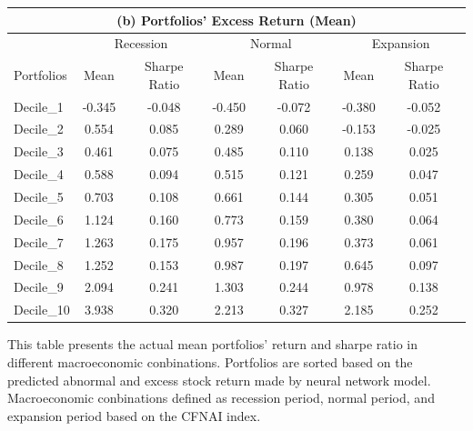 \begin{table}[H]
\begin{tabular}{l|cc|cc|cc}
      \multicolumn{7}{c}{(b) Portfolios' Excess Return (Mean)}\\\hline
      ~ & \multicolumn{2}{c}{Recession} & \multicolumn{2}{c}{Normal} & \multicolumn{2}{c}{Expansion} \\ \cline{2-7}
      Portfolios & Mean & Sharpe Ratio & Mean & Sharpe Ratio & Mean & Sharpe Ratio \\ \hline
      Decile\_1 & -0.345 & -0.048 & -0.450 & -0.072 & -0.380 & -0.052 \\ 
      Decile\_2 & 0.554 & 0.085 & 0.289 & 0.060 & -0.153 & -0.025 \\ 
      Decile\_3 & 0.461 & 0.075 & 0.485 & 0.110 & 0.138 & 0.025 \\ 
      Decile\_4 & 0.588 & 0.094 & 0.515 & 0.121 & 0.259 & 0.047 \\ 
      Decile\_5 & 0.703 & 0.108 & 0.661 & 0.144 & 0.305 & 0.051 \\ 
      Decile\_6 & 1.124 & 0.160 & 0.773 & 0.159 & 0.380 & 0.064 \\ 
      Decile\_7 & 1.263 & 0.175 & 0.957 & 0.196 & 0.373 & 0.061 \\ 
      Decile\_8 & 1.252 & 0.153 & 0.987 & 0.197 & 0.645 & 0.097 \\ 
      Decile\_9 & 2.094 & 0.241 & 1.303 & 0.244 & 0.978 & 0.138 \\ 
      Decile\_10 & 3.938 & 0.320 & 2.213 & 0.327 & 2.185 & 0.252 \\ \hline
  \end{tabular}
  \label{table: portfolio ret in tertiles}
  \begin{tablenotes}
    \footnotesize
    \item This table presents the actual mean portfolios' return and sharpe ratio in different macroeconomic conbinations. Portfolios are sorted based on the predicted abnormal and excess stock return made by neural network model. Macroeconomic conbinations defined as recession period, normal period, and expansion period based on the CFNAI index.
  \end{tablenotes}
\end{table}


